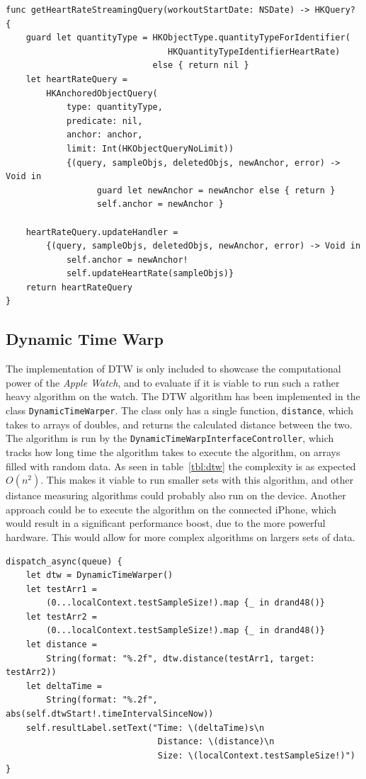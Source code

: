 \begin{lstlisting}[label={lst:streaminghr},caption={Setting up a streaming heart
rate query for continuous handling of samples generated by the heart rate
sensor.},basicstyle=\small]
func getHeartRateStreamingQuery(workoutStartDate: NSDate) -> HKQuery? {
    guard let quantityType = HKObjectType.quantityTypeForIdentifier(
                                HKQuantityTypeIdentifierHeartRate) 
                             else { return nil }
    let heartRateQuery = 
        HKAnchoredObjectQuery(
            type: quantityType,
            predicate: nil,
            anchor: anchor,
            limit: Int(HKObjectQueryNoLimit))
            {(query, sampleObjs, deletedObjs, newAnchor, error) -> Void in
                  guard let newAnchor = newAnchor else { return }
                  self.anchor = newAnchor }

    heartRateQuery.updateHandler = 
        {(query, sampleObjs, deletedObjs, newAnchor, error) -> Void in
            self.anchor = newAnchor!
            self.updateHeartRate(sampleObjs)}
    return heartRateQuery
}
\end{lstlisting}

\subsection{Dynamic Time Warp}
The implementation of DTW is only included to showcase the computational power of
the \textit{Apple Watch}, and to evaluate if it is viable to run such a rather
heavy algorithm on the watch.
The DTW algorithm has been implemented in the class \texttt{DynamicTimeWarper}. 
The class only has a single function, \texttt{distance}, which takes to arrays of 
doubles, and returns the calculated distance between the two. The algorithm is 
run by the \texttt{DynamicTimeWarpInterfaceController}, which tracks how long 
time the algorithm takes to execute the algorithm, on arrays filled with random 
data. 
As seen in table~\ref{tbl:dtw} the complexity is as expected $O(n^2)$.
This makes it viable to run smaller sets with this algorithm, and other distance
measuring algorithms could probably also run on the device.
Another approach could be to execute the algorithm on the connected iPhone,
which would result in a significant performance boost, due to the more powerful
hardware. This would allow for more complex algorithms on largers sets of data.


\begin{lstlisting}[label={lst:dtw},caption={Testing of the implemented DTW
    algorithm, within the DynamicTimeWarpInterfaceController},basicstyle=\small]
dispatch_async(queue) {
    let dtw = DynamicTimeWarper()
    let testArr1 = 
        (0...localContext.testSampleSize!).map {_ in drand48()}
    let testArr2 = 
        (0...localContext.testSampleSize!).map {_ in drand48()}
    let distance = 
        String(format: "%.2f", dtw.distance(testArr1, target: testArr2))
    let deltaTime = 
        String(format: "%.2f", abs(self.dtwStart!.timeIntervalSinceNow))
    self.resultLabel.setText("Time: \(deltaTime)s\n
                              Distance: \(distance)\n
                              Size: \(localContext.testSampleSize!)")
}
\end{lstlisting}

